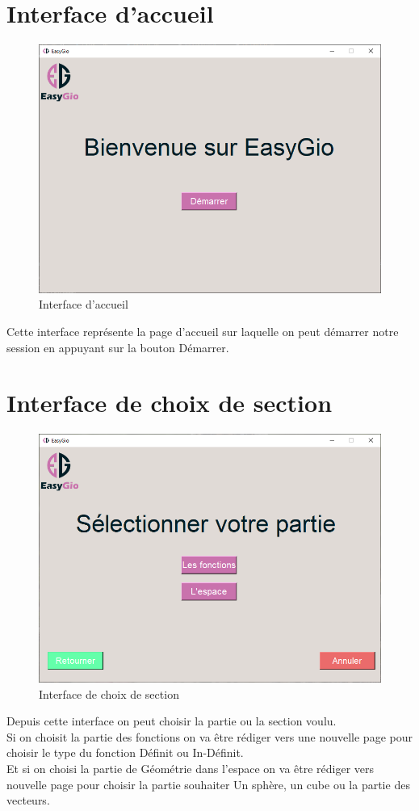 \documentclass[a4paper]{report}
\begin{document}
\section{Interface d'accueil}
\begin{figure}[!h]
    \centering
    \includegraphics[width=15cm]{images/Interface1.PNG}
    \caption{Interface d'accueil}
    \label{fig:Interface d'accueil}
\end{figure}
Cette interface représente la page d'accueil sur laquelle on peut démarrer notre session en appuyant sur la bouton Démarrer.
\newpage
\section{Interface de choix de section}
\begin{figure}[!h]
    \centering
    \includegraphics[width=12cm]{images/Interface2.PNG}
    \caption{Interface de choix de section}
    \label{fig:Interface de choix de section}
\end{figure}
Depuis cette interface on peut choisir la partie ou la section voulu.\\
Si on choisit la partie des fonctions on va être rédiger vers une nouvelle page pour choisir le type du fonction Définit ou In-Définit.\\
Et si on choisi la partie de Géométrie dans l'espace on va être rédiger vers nouvelle page pour choisir la partie souhaiter Un sphère, un cube ou la partie des vecteurs.
\end{document}
